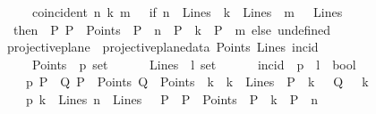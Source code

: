 \begin{isabellebody}
\ \ \ \ \ {\isachardoublequoteopen}coincident\ n\ k\ m\ \ {\isacharequal}{\kern0pt}\ {\isacharparenleft}{\kern0pt}if\ {\isacharparenleft}{\kern0pt}n\ {\isasymin}\ Lines{\isacharparenright}{\kern0pt}\ {\isasymand}\ {\isacharparenleft}{\kern0pt}k\ {\isasymin}\ Lines{\isacharparenright}{\kern0pt}\ {\isasymand}\ {\isacharparenleft}{\kern0pt}m\ \ {\isasymin}\ Lines{\isacharparenright}{\kern0pt}\isanewline
\ \ then\ {\isacharparenleft}{\kern0pt}{\isasymexists}\ P{\isachardot}{\kern0pt}\ P\ {\isasymin}\ Points\ {\isasymand}\ P\ {\isasymlhd}\ n\ {\isasymand}\ P\ {\isasymlhd}\ k\ {\isasymand}\ P\ {\isasymlhd}\ m{\isacharparenright}{\kern0pt}\ else\ undefined{\isacharparenright}{\kern0pt}{\isachardoublequoteclose}\isanewline
{}\isamarkupfalse%
\ \isanewline
\isanewline
\isanewline
\isanewline
{}\isamarkupfalse%
\ projective{\isacharunderscore}{\kern0pt}plane{}\ {\isacharequal}{\kern0pt}\ projective{\isacharunderscore}{\kern0pt}plane{\isacharunderscore}{\kern0pt}data{}\ Points\ Lines\ incid\isanewline
\ \ \isanewline
\ \ \ \ \ Points\ {\isacharcolon}{\kern0pt}{\isacharcolon}{\kern0pt}\ {\isachardoublequoteopen}{\isacharprime}{\kern0pt}p\ set{\isachardoublequoteclose}\ \isanewline
\ \ \ \ \ Lines\ {\isacharcolon}{\kern0pt}{\isacharcolon}{\kern0pt}\ {\isachardoublequoteopen}{\isacharprime}{\kern0pt}l\ set{\isachardoublequoteclose}\ \isanewline
\ \ \ \ \ incid\ {\isacharcolon}{\kern0pt}{\isacharcolon}{\kern0pt}\ {\isachardoublequoteopen}{\isacharprime}{\kern0pt}p\ {\isasymRightarrow}\ {\isacharprime}{\kern0pt}l\ {\isasymRightarrow}\ bool{\isachardoublequoteclose}\ \ {\isacharparenleft}{\kern0pt}\ {\isachardoublequoteopen}{\isasymlhd}{\isachardoublequoteclose}\ {}{}{\isacharparenright}{\kern0pt}\ \ {\isacharplus}{\kern0pt}\ \isanewline
{}\isanewline
\ \ \ \ p{}{\isacharcolon}{\kern0pt}\ {\isachardoublequoteopen}{\isasymlbrakk}P\ {\isasymnoteq}\ Q{\isacharsemicolon}{\kern0pt}\ P\ {\isasymin}\ Points{\isacharsemicolon}{\kern0pt}\ Q\ {\isasymin}\ Points{\isasymrbrakk}\ {\isasymLongrightarrow}\ {\isacharparenleft}{\kern0pt}{\isasymexists}{\isacharbang}{\kern0pt}k\ {\isachardot}{\kern0pt}\ k\ {\isasymin}\ Lines\ {\isasymand}\ P\ {\isasymlhd}\ k\ \ {\isasymand}\ Q\ {\isasymlhd}\ \ k{\isacharparenright}{\kern0pt}{\isachardoublequoteclose}\ \isanewline
\ \ \ \ p{}{\isacharcolon}{\kern0pt}\ {\isachardoublequoteopen}{\isasymlbrakk}k\ {\isasymin}\ Lines{\isacharsemicolon}{\kern0pt}\ n\ {\isasymin}\ Lines{\isasymrbrakk}\ {\isasymLongrightarrow}\ {\isasymexists}\ P\ {\isachardot}{\kern0pt}\ {\isacharparenleft}{\kern0pt}P\ {\isasymin}\ Points\ {\isasymand}\ P\ {\isasymlhd}\ k\ {\isasymand}\ P\ {\isasymlhd}\ n{\isacharparenright}{\kern0pt}{\isachardoublequoteclose}\ \isanewline

\end{isabellebody}
